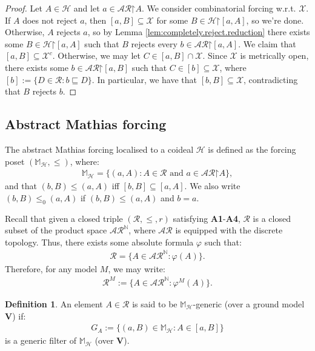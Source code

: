 \documentclass[10pt,a4paper]{amsart}
\theoremstyle{plain}
\numberwithin{equation}{section}
\theoremstyle{definition}
\newtheorem{definition}[theorem]{Definition}
\newcommand{\N}{\mathbb{N}}
\newcommand{\cal}{\mathcal}
\renewcommand{\bf}{\mathbf}
\newcommand{\restrictedto}{\mathord{\upharpoonright}}
\newcommand{\V}{\bf{V}}
\newcommand{\X}{\cal{X}}
\renewcommand{\H}{\cal{H}}
\begin{document}
\begin{proof}
    Let $A \in \H$ and let $a \in \cal{AR}\restrictedto A$. We consider combinatorial forcing w.r.t. $\X$. If $A$ does not reject $a$, then $[a,B] \subseteq \X$ for some $B \in \H\restrictedto[a,A]$, so we're done. Otherwise, $A$ rejects $a$, so by Lemma \ref{lem:completely.reject.reduction} there exists some $B \in \H\restrictedto[a,A]$ such that $B$ rejects every $b \in \cal{AR}\restrictedto[a,A]$. We claim that $[a,B] \subseteq \X^c$. Otherwise, we may let $C \in [a,B] \cap \X$. Since $\X$ is metrically open, there exists some $b \in \cal{AR}\restrictedto[a,B]$ such that $C \in [b] \subseteq \X$, where $[b] := \{D \in \cal{R} : b \sqsubseteq D\}$. In particular, we have that $[b,B] \subseteq \X$, contradicting that $B$ rejects $b$.
\end{proof}

\subsection{Abstract Mathias forcing}
The abstract Mathias forcing localised to a coideal $\H$ is defined as the forcing poset $(\mathbb{M}_\H,\leq)$, where:
\begin{align*}
    \mathbb{M}_\H = \{(a,A) : A \in \cal{R} \text{ and } a \in \cal{AR}\restrictedto A\},
\end{align*}
and that $(b,B) \leq (a,A)$ iff $[b,B] \subseteq [a,A]$. We also write $(b,B) \leq_0 (a,A)$ if $(b,B) \leq (a,A)$ and $b = a$. 

Recall that given a closed triple $(\cal{R},\leq,r)$ satisfying \textbf{A1}-\textbf{A4}, $\cal{R}$ is a closed subset of the product space $\cal{AR}^\N$, where $\cal{AR}$ is equipped with the discrete topology. Thus, there exists some absolute formula $\varphi$ such that:
\begin{align*}
    \cal{R} = \{A \in \cal{AR}^\N : \varphi(A)\}.
\end{align*}
Therefore, for any model $M$, we may write:
\begin{align*}
    \cal{R}^M := \{A \in \cal{AR}^\N : \varphi^M(A)\}.
\end{align*}

\begin{definition}
    An element $A \in \cal{R}$ is said to be $\mathbb{M}_\H$-generic (over a ground model $\V$) if:
    \begin{align*}
        G_A := \{(a,B) \in \mathbb{M}_\H : A \in [a,B]\}
    \end{align*}
    is a generic filter of $\mathbb{M}_\H$ (over $\V$).
\end{definition}
\end{document}
